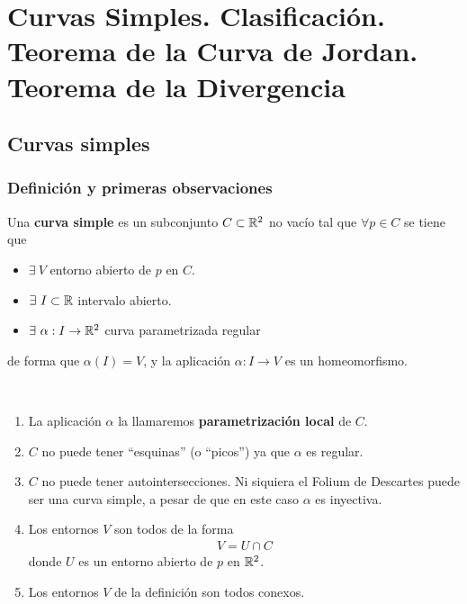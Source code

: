 \chapter{Curvas Simples. Clasificación. Teorema de la Curva de Jordan. Teorema de la Divergencia}

\section{Curvas simples}

\subsection{Definición y primeras observaciones}

\begin{definicion}
    Una \textbf{curva simple} es un subconjunto $C\subset \mathbb{R}^2$ no vacío tal que $\forall p\in C$ se tiene que 
    \begin{itemize}
        \item $\exists\ V$ entorno abierto de $p$ en $C$.
        \item $\exists\ I\subset \mathbb{R}$ intervalo abierto.
        \item $\exists\ \alpha:I \to \mathbb{R}^2$ curva parametrizada regular
    \end{itemize} 
    de forma que $\alpha(I)=V$, y la aplicación $\alpha:I\to V$ es un homeomorfismo.
\end{definicion}



\begin{observacion}\
    \begin{enumerate}
        \item La aplicación $\alpha$ la llamaremos \textbf{parametrización local} de $C$.
        \item $C$ no puede tener ``esquinas'' (o ``picos'') ya que $\alpha$ es regular.
        \item $C$ no puede tener autointersecciones. Ni siquiera el Folium de Descartes puede ser una curva simple, a pesar de que en este caso $\alpha$ es inyectiva.
        \item Los entornos $V$ son todos de la forma
        \begin{gather*}
            V = U\cap C
        \end{gather*}
        donde $U$ es un entorno abierto de $p$ en $\mathbb{R}^2$.
        \item Los entornos $V$ de la definición son todos conexos.
    \end{enumerate}
\end{observacion}

